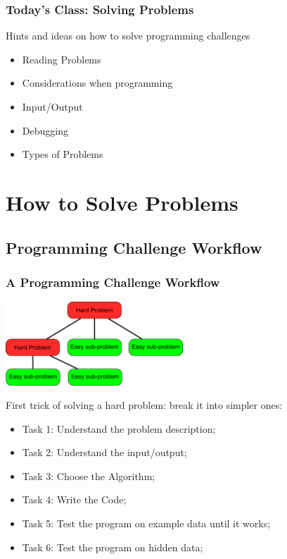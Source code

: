 \documentclass{beamer}
\begin{document}
\begin{frame}
  \frametitle{Today's Class: Solving Problems}
  \begin{block}{}
    Hints and ideas on how to solve programming challenges
  \end{block}

  \bigskip

  \begin{itemize}
  \item Reading Problems
  \item Considerations when programming
  \item Input/Output
  \item Debugging
  \item Types of Problems
  \end{itemize}
\end{frame}

\section{How to Solve Problems}
\subsection{Programming Challenge Workflow}
\begin{frame}
  \frametitle{A Programming Challenge Workflow}

  \begin{center}
    \includegraphics[width=0.5\textwidth]{../img/breakingtheproblem}
  \end{center}

  First trick of solving a hard problem: break it into simpler ones:
  
  {\smaller
  \begin{itemize}
  \item Task 1: Understand the problem description;
  \item Task 2: Understand the input/output;
  \item Task 3: Choose the Algorithm;
  \item Task 4: Write the Code;
  \item Task 5: Test the program on example data until it works;
  \item Task 6: Test the program on hidden data;
  \end{itemize}}
\end{frame}
\end{document}
